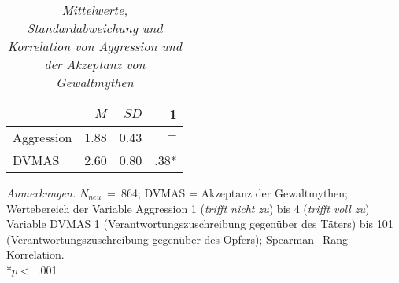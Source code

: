 \begin{table}[htb]
    \caption[Mittelwerte, Standardabweichung und Korrelation von Aggression und der Akzeptanz von Gewaltmythen]{\textit {Mittelwerte, Standardabweichung und Korrelation von Aggression und der Akzeptanz von Gewaltmythen}} 
    \label{H2_Pearson}
    \centering
    \begin{adjustbox}{width=5.5cm} %
    \small
    \begin{tabular}{lrrr}
      \hline
        & $M$   & $SD$ & 1 \\
      \hline
    Aggression      & 1.88 & 0.43  & $-$      \\
    DVMAS           & 2.60 & 0.80  & .38*      \\
       \hline
    \end{tabular}
    \end{adjustbox}
    
    \begin{tablenotes}
        \item \textit{Anmerkungen.} \( N_{neu} \)~=~864; DVMAS = Akzeptanz der Gewaltmythen; Wertebereich der Variable Aggression 1 (\textit{trifft nicht zu}) bis 4 (\textit{trifft voll zu}) Variable DVMAS 1 (Verantwortungszuschreibung gegenüber des Täters) bis 101 (Verantwortungszuschreibung gegenüber des Opfers); Spearman$-$Rang$-$Korrelation. \\ *$p<$~.001
      \end{tablenotes}
    \end{table}

